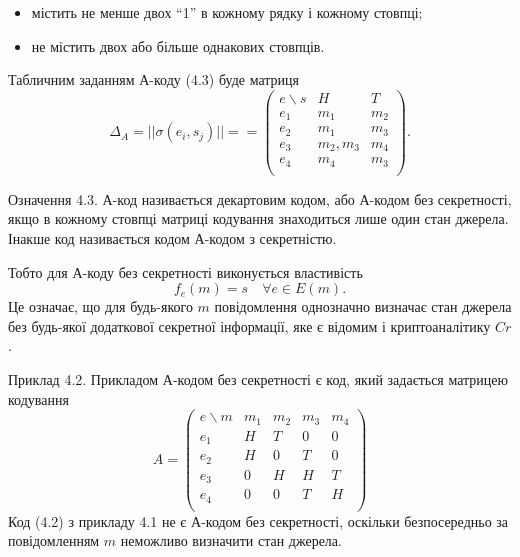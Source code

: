 \begin{example}
\begin{itemize}
        \item містить не менше двох ``1'' в кожному рядку і кожному стовпці;
        \item не містить двох або більше однакових стовпців.
    \end{itemize}
    Табличним заданням А-коду (4.3) буде матриця
    \begin{equation*}
        \Delta_A = ||\sigma(e_i, s_j)|| = = \begin{pmatrix}
            e\backslash s & H & T \\
            e_1 & m_1 & m_2 \\
            e_2 & m_1 & m_3 \\
            e_3 & m_2, m_3 & m_4 \\
            e_4 & m_4 & m_3  \\
        \end{pmatrix}.
    \end{equation*}
\end{example}

\begin{definition}
    Означення 4.3. А-код називається декартовим кодом, або А-кодом без
    секретності, якщо в кожному стовпці матриці кодування знаходиться лише
    один стан джерела. Інакше код називається кодом А-кодом з секретністю.
\end{definition}

Тобто для А-коду без секретності виконується властивість
\begin{equation*}
    f_e(m) = s \quad \forall e \in E(m).
\end{equation*}
Це означає, що для будь-якого $m$ повідомлення однозначно визначає стан
джерела без будь-якої додаткової секретної інформації, яке є відомим і
криптоаналітику $Cr$.

\begin{example}
    Приклад 4.2. Прикладом А-кодом без секретності є код, який задається
    матрицею кодування
    \begin{equation*}
        A = \begin{pmatrix}
            e\backslash m & m_1 & m_2 & m_3 & m_4 \\
            e_1 & H & T & 0 & 0 \\
            e_2 & H & 0 & T & 0 \\
            e_3 & 0 & H & H & T \\
            e_4 & 0 & 0 & T & H \\
        \end{pmatrix}
    \end{equation*}
    Код (4.2) з прикладу 4.1 не є А-кодом без секретності, оскільки
    безпосередньо за повідомленням $m$ неможливо визначити стан джерела.
\end{example}

